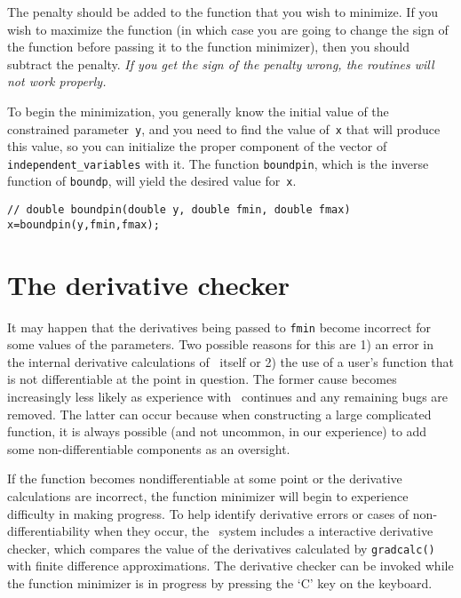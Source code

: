 \documentclass{admbmanual}
\begin{document}
The penalty should be added to the function that you wish
to minimize. If you wish to maximize the function (in which case
you are going to change the sign of the function before passing it to
the function minimizer), then you should subtract the penalty.
\textit{If you get the sign of the penalty wrong, the routines will not
work properly.}

To begin the minimization, you generally know the initial value of the
constrained parameter~\texttt{y}, and you need to find the value of~\texttt{x}
that will produce this value, so you can initialize the 
proper component of the vector of \texttt{independent\_variables}
with it.  The function \texttt{boundpin}, which is the
inverse function of \texttt{boundp}, will yield the
desired value for~\texttt{x}.  
\begin{lstlisting}
// double boundpin(double y, double fmin, double fmax)
x=boundpin(y,fmin,fmax);
\end{lstlisting}


\section{The derivative checker}

It may happen that the derivatives being passed to \texttt{fmin} become incorrect
for some values of the parameters. Two possible reasons for this are 1)
an error in the internal derivative calculations of \scAD\ itself or 2)
the use of a user's function that is not differentiable at the point  
in question. The former cause becomes increasingly less likely as
experience with \scAD\ continues and any remaining bugs are removed. The latter
can occur because when constructing a large complicated function, it is always
possible (and not uncommon, in our experience) to add some non-differentiable 
components as an oversight.

If the function becomes nondifferentiable at some point or the
derivative calculations are incorrect, the function minimizer will
begin to experience difficulty in making progress.
To help identify derivative errors or cases of non-differentiability 
when they occur,
the \scAD\ system includes a interactive derivative checker, which compares the
value of the derivatives calculated by \texttt{gradcalc()} with 
finite difference approximations. The derivative checker 
can be invoked while the
function minimizer is in progress by pressing the `C' key on the keyboard.
\end{document}
